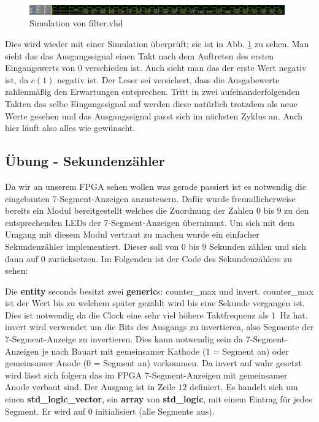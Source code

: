 \begin{figure}[ht]
	\centering
    \includegraphics[width=0.98\textwidth]{../Daten/filter.png}
	\caption{Simulation von filter.vhd}
	\label{img_filter}
\end{figure}

Dies wird wieder mit einer Simulation überprüft; sie ist in Abb. \ref{img_filter} zu sehen.
Man sieht das das Ausgangssignal einen Takt nach dem Auftreten des ersten Eingangswerts von $0$ verschieden ist.
Auch sieht man das der erste Wert negativ ist, da $c(1)$ negativ ist.
Der Leser sei versichert, dass die Ausgabewerte zahlenmäßig den Erwartungen entsprechen.
Tritt in zwei aufeinanderfolgenden Takten das selbe Eingangssignal auf werden diese natürlich trotzdem als neue Werte gesehen und das Ausgangssignal passt sich im nächsten Zyklus an.
Auch hier läuft also alles wie gewünscht.

\subsection{Übung - Sekundenzähler}

Da wir an unserem FPGA sehen wollen was gerade passiert ist es notwendig die eingebauten 7-Segment-Anzeigen anzusteuern.
Dafür wurde freundlicherweise bereits ein Modul bereitgestellt welches die Zuordnung der Zahlen $0$ bis $9$ zu den entsprechenden LEDs der 7-Segment-Anzeigen übernimmt.
Um sich mit dem Umgang mit diesem Modul vertraut zu machen wurde ein einfacher Sekundenzähler implementiert.
Dieser soll von $0$ bis $9$ Sekunden zählen und sich dann auf $0$ zurücksetzen.
Im Folgenden ist der Code des Sekundenzählers zu sehen:



Die \textbf{entity} seconds besitzt zwei \textbf{generic}s: counter\_max und invert.
counter\_max ist der Wert bis zu welchem später gezählt wird bis eine Sekunde vergangen ist.
Dies ist notwendig da die Clock eine sehr viel höhere Taktfrequenz als \SI{1}{\hertz} hat.
invert wird verwendet um die Bits des Ausgangs zu invertieren, also Segmente der 7-Segment-Anzeige zu invertieren.
Dies kann notwendig sein da 7-Segment-Anzeigen je nach Bauart mit gemeinsamer Kathode ($1$ = Segment an) oder gemeinsamer Anode ($0$ = Segment an) vorkommen.
Da invert auf wahr gesetzt wird lässt sich folgern das im FPGA 7-Segment-Anzeigen mit gemeinsamer Anode verbaut sind.
Der Ausgang ist in Zeile $12$ definiert.
Es handelt sich um einen \textbf{std\_logic\_vector}, ein \textbf{array} von \textbf{std\_logic}, mit einem Eintrag für jedes Segment.
Er wird auf $0$ initialisiert (alle Segmente aus).


